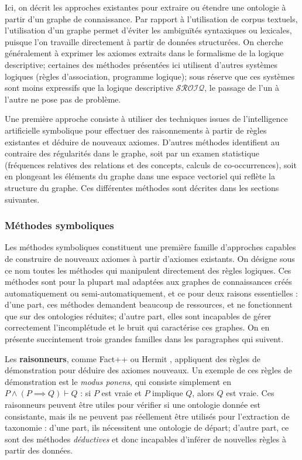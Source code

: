 Ici, on décrit les approches existantes pour extraire ou étendre une ontologie à partir d'un graphe de connaissance. %
Par rapport à l'utilisation de corpus textuels, l'utilisation d'un graphe permet d'éviter les ambiguïtés syntaxiques ou lexicales, puisque l'on travaille directement à partir de données structurées.
On cherche généralement à exprimer les axiomes extraits dans le formalisme de la logique descriptive; certaines des méthodes présentées ici utilisent d'autres systèmes logiques (règles d'association, programme logique); sous réserve que ces systèmes sont moins expressifs que la logique descriptive $\mathcal{SROIQ}$, le passage de l'un à l'autre ne pose pas de problème.

Une première approche consiste à utiliser des techniques issues de l'intelligence artificielle symbolique pour effectuer des raisonnements à partir de règles existantes et déduire de nouveaux axiomes. D'autres méthodes identifient au contraire des régularités dans le graphe, soit par un examen statistique (fréquences relatives des relations et des concepts, calculs de co-occurrences), soit en plongeant les éléments du graphe dans une espace vectoriel qui reflète la structure du graphe. Ces différentes méthodes sont décrites dans les sections suivantes.


\subsubsection{Méthodes symboliques}

Les méthodes symboliques constituent une première famille d'approches capables de construire de nouveaux axiomes à partir d'axiomes existants. On désigne sous ce nom toutes les méthodes qui manipulent directement des règles logiques.
Ces méthodes sont pour la plupart mal adaptées aux graphes de connaissances créés automatiquement ou semi-automatiquement, et ce pour deux raisons essentielles : d'une part, ces méthodes demandent beaucoup de ressources, et ne fonctionnent que sur des ontologies réduites; d'autre part, elles sont incapables de gérer correctement l'incomplétude et le bruit qui caractérise ces graphes.  On en présente succintement trois grandes familles dans les paragraphes qui suivent.

Les \textbf{raisonneurs}, comme Fact++ \cite{tsarkov2006fact++} ou Hermit \cite{glimm2014hermit}, appliquent des règles de démonstration pour déduire des axiomes nouveaux. Un exemple de ces règles de démonstration est le \textit{modus ponens}, qui consiste simplement en $P \land (P \implies Q) \vdash Q$ : si $P$ est vraie et $P$ implique $Q$, alors $Q$ est vraie. Ces raisonneurs peuvent être utiles pour vérifier si une ontologie donnée est consistante, mais ils ne peuvent pas réellement être utilisés pour l'extraction de taxonomie : 
d'une part, ils nécessitent une ontologie de départ; d'autre part, ce sont des méthodes \textit{déductives} et donc incapables d'inférer de nouvelles règles à partir des données. %

